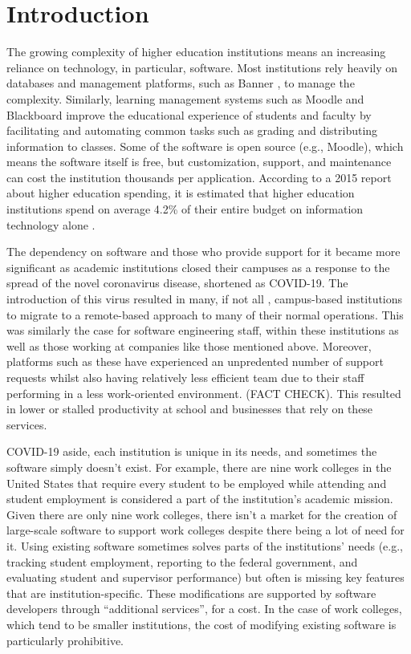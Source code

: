 \section{Introduction}

The growing complexity of higher education institutions means an increasing reliance on technology, in particular, software. Most institutions rely heavily on databases and management platforms, such as Banner \cite{BannerWebsite}, to manage the complexity. Similarly, learning management systems such as Moodle \cite{MoodleWebsite} and Blackboard \cite{BlackboardWebsite} improve the educational experience of students and faculty by facilitating and automating common tasks such as grading and distributing information to classes. Some of the software is open source (e.g., Moodle), which means the software itself is free, but customization, support, and maintenance can cost the institution thousands per application. According to a 2015 report about higher education spending, it is estimated that higher education institutions spend on average 4.2\% of their entire budget on information technology alone \cite{CDSBenchmarkReport}.

The dependency on software and those who provide support for it became more significant as academic institutions closed their campuses as a response to the spread of the novel coronavirus disease, shortened as COVID-19. The introduction of this virus resulted in many, if not all \cite{?}, campus-based institutions to migrate to a remote-based approach to many of their normal operations. This was similarly the case for software engineering staff, within these institutions as well as those working at companies like those mentioned above. Moreover, platforms such as these have experienced an unpredented number of support requests whilst also having relatively less efficient team due to their staff performing in a less work-oriented environment. (FACT CHECK). This resulted in lower or stalled productivity at school and businesses that rely on these services. 

COVID-19 aside, each institution is unique in its needs, and sometimes the software simply doesn't exist. For example, there are nine work colleges in the United States \cite{WCCMembers, Ecclesia} that require every student to be employed while attending and student employment is considered a part of the institution's academic mission. Given there are only nine work colleges, there isn't a market for the creation of large-scale software to support work colleges despite there being a lot of need for it. Using existing software sometimes solves parts of the institutions’ needs (e.g., tracking student employment, reporting to the federal government, and evaluating student and supervisor performance) but often is missing key features that are institution-specific. These modifications are supported by software developers through “additional services”, for a cost. In the case of work colleges, which tend to be smaller institutions, the cost of modifying existing software is particularly prohibitive.

